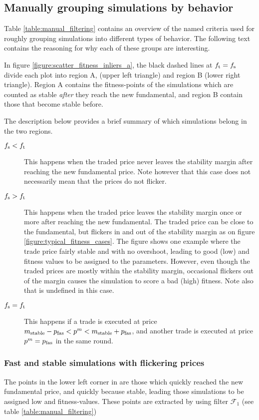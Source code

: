 \subsection{Manually grouping simulations by behavior}\label{section:manually_grouping_simulations}
Table \ref{table:manual_filtering} contains an overview of the named criteria used for roughly grouping simulations into different types of behavior. The following text contains the reasoning for why each of these groups are interesting.

In figure \ref{figure:scatter_fitness_inliers_a}, the black dashed lines at $f_\text{t} = f_\text{s}$ divide each plot into region A, (upper left triangle) and region B (lower right triangle). Region A contains the fitness-points of the simulations which are counted as stable \textit{after} they reach the new fundamental, and region B contain those that become stable before. 

The description below provides a brief summary of which simulations belong in the two regions.
\begin{description}
\item[$f_\text{s} < f_\text{t}$] This happens when the traded price never leaves the stability margin after reaching the new fundamental price. Note however that this case does not necessarily mean that the prices do not flicker. 
\item[$f_\text{s} > f_\text{t}$] This happens when the traded price leaves the stability margin once or more after reaching the new fundamental. The traded price can be close to the fundamental, but flickers in and out of the stability margin as on figure \ref{figure:typical_fitness_cases}. The figure shows one example where the trade price fairly stable and with no overshoot, leading to good (low) \stdev{} and \overshoot{} fitness values to be assigned to the parameters. However, even though the traded prices are mostly within the stability margin, occasional flickers out of the margin causes the simulation to score a bad (high) \roundstable{} fitness. Note also that \timetoreachnewfundamental{} is undefined in this case. 
\item[$f_\text{s} = f_\text{t}$] This happens if a trade is executed at price $m_\text{stable} - p_\text{fas} < p^m < m_\text{stable} + p_\text{fas}$, and another trade is executed at price $p^m = p_\text{fas}$ in the same round. 
\end{description}


\subsubsection*{Fast and stable simulations with flickering prices}
The points in the lower left corner in are those which quickly reached the new fundamental price, and quickly because stable, leading those simulations to be assigned low \timetoreachnewfundamental{} and \roundstable{} fitness-values. These points are extracted by using filter $\mathcal{F}_1$ (see table \ref{table:manual_filtering})


